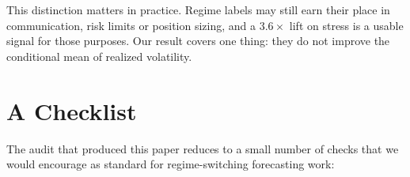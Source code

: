 \documentclass[sigconf,nonacm]{acmart}
\begin{document}
This distinction matters in practice. Regime labels may still earn their place in
communication, risk limits or position sizing, and a $3.6\times$ lift on stress
is a usable signal for those purposes. Our result covers one thing: they do not
improve the conditional mean of realized volatility.

\section{A Checklist}

The audit that produced this paper reduces to a small number of checks that we
would encourage as standard for regime-switching forecasting work:
\end{document}
